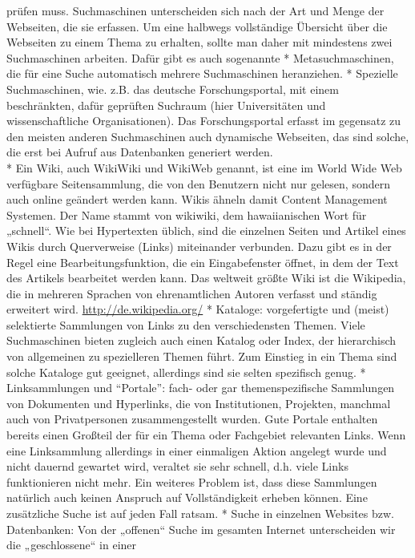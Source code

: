 \documentclass[]{book}
\theoremstyle{definition}
\theoremstyle{definition}
\theoremstyle{definition}
\theoremstyle{remark}
\begin{document}
prüfen muss. Suchmaschinen unterscheiden sich nach der Art und Menge der
Webseiten, die sie erfassen. Um eine halbwegs vollständige Übersicht
über die Webseiten zu einem Thema zu erhalten, sollte man daher mit
mindestens zwei Suchmaschinen arbeiten. Dafür gibt es auch sogenannte *
Metasuchmaschinen, die für eine Suche automatisch mehrere Suchmaschinen
heranziehen. * Spezielle Suchmaschinen, wie. z.B. das deutsche
Forschungsportal, mit einem beschränkten, dafür geprüften Suchraum (hier
Universitäten und wissenschaftliche Organisationen). Das
Forschungsportal erfasst im gegensatz zu den meisten anderen
Suchmaschinen auch dynamische Webseiten, das sind solche, die erst bei
Aufruf aus Datenbanken generiert werden.\\
* Ein Wiki, auch WikiWiki und WikiWeb genannt, ist eine im World Wide
Web verfügbare Seitensammlung, die von den Benutzern nicht nur gelesen,
sondern auch online geändert werden kann. Wikis ähneln damit Content
Management Systemen. Der Name stammt von wikiwiki, dem hawaiianischen
Wort für „schnell``. Wie bei Hypertexten üblich, sind die einzelnen
Seiten und Artikel eines Wikis durch Querverweise (Links) miteinander
verbunden. Dazu gibt es in der Regel eine Bearbeitungsfunktion, die ein
Eingabefenster öffnet, in dem der Text des Artikels bearbeitet werden
kann. Das weltweit größte Wiki ist die Wikipedia, die in mehreren
Sprachen von ehrenamtlichen Autoren verfasst und ständig erweitert wird.
\url{http://de.wikipedia.org/} * Kataloge: vorgefertigte und (meist)
selektierte Sammlungen von Links zu den verschiedensten Themen. Viele
Suchmaschinen bieten zugleich auch einen Katalog oder Index, der
hierarchisch von allgemeinen zu spezielleren Themen führt. Zum Einstieg
in ein Thema sind solche Kataloge gut geeignet, allerdings sind sie
selten spezifisch genug. * Linksammlungen und ``Portale'': fach- oder
gar themenspezifische Sammlungen von Dokumenten und Hyperlinks, die von
Institutionen, Projekten, manchmal auch von Privatpersonen
zusammengestellt wurden. Gute Portale enthalten bereits einen Großteil
der für ein Thema oder Fachgebiet relevanten Links. Wenn eine
Linksammlung allerdings in einer einmaligen Aktion angelegt wurde und
nicht dauernd gewartet wird, veraltet sie sehr schnell, d.h. viele Links
funktionieren nicht mehr. Ein weiteres Problem ist, dass diese
Sammlungen natürlich auch keinen Anspruch auf Vollständigkeit erheben
können. Eine zusätzliche Suche ist auf jeden Fall ratsam. * Suche in
einzelnen Websites bzw. Datenbanken: Von der „offenen`` Suche im
gesamten Internet unterscheiden wir die „geschlossene`` in einer
\end{document}

